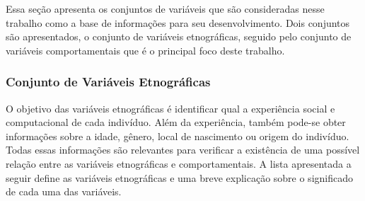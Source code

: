 Essa seção apresenta os conjuntos de variáveis que são consideradas nesse trabalho como a base de informações para seu desenvolvimento. Dois conjuntos são apresentados, o conjunto de variáveis etnográficas, seguido pelo conjunto de variáveis comportamentais que é o principal foco deste trabalho.

\subsubsection{Conjunto de Variáveis Etnográficas}
\label{sec:variaveisetnograficas}

O objetivo das variáveis etnográficas é identificar qual a experiência social e computacional de cada indivíduo. Além da experiência, também pode-se obter informações sobre a idade, gênero, local de nascimento ou origem do indivíduo. Todas essas informações são relevantes para verificar a existência de uma possível relação entre as variáveis etnográficas e comportamentais. A lista apresentada a seguir define as variáveis etnográficas e uma breve explicação sobre o significado de cada uma das variáveis.

